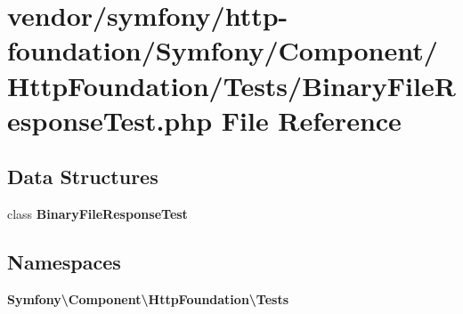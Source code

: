 \section{vendor/symfony/http-\/foundation/\+Symfony/\+Component/\+Http\+Foundation/\+Tests/\+Binary\+File\+Response\+Test.php File Reference}
\label{_binary_file_response_test_8php}
\subsection*{Data Structures}
\begin{DoxyCompactItemize}
\item 
class {\bf Binary\+File\+Response\+Test}
\end{DoxyCompactItemize}
\subsection*{Namespaces}
\begin{DoxyCompactItemize}
\item 
 {\bf Symfony\textbackslash{}\+Component\textbackslash{}\+Http\+Foundation\textbackslash{}\+Tests}
\end{DoxyCompactItemize}
